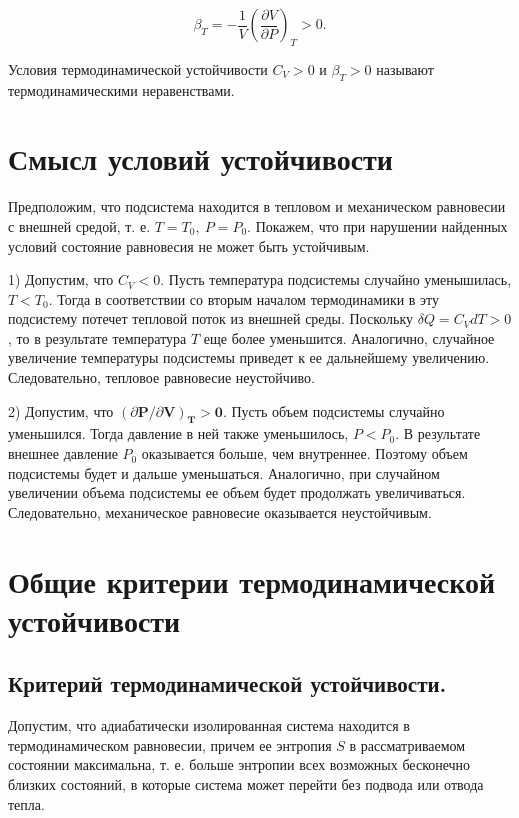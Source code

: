 \documentclass[a4paper,14pt]{article} %
\begin{document}
\begin{equation*}
	\beta_{T}=-\frac{1}{V}\left(\frac{\partial V}{\partial P}\right)_{T}>0.
\end{equation*}

Условия термодинамической устойчивости $C_V > 0$ и $\beta_{T} > 0$ называют 
термодинамическими неравенствами.

\section{Смысл условий устойчивости}

Предположим, что подсистема находится в тепловом и механическом равновесии с внешней средой, т. е. $T=T_{0},\ P=P_{0} .$ Покажем, что при нарушении найденных условий состояние равновесия не может быть устойчивым.

1) Допустим, что $C_{V}<0 .$ Пусть температура подсистемы случайно уменышилась, $T<T_{0} .$ Тогда в соответствии со вторым началом термодинамики в эту подсистему потечет тепловой поток из внешней среды. Поскольку $\delta Q=C_{V} d T>0$, то в результате температура $T$ еще более уменьшится. Аналогично, случайное увеличение температуры подсистемы приведет к ее дальнейшему увеличению. Следовательно, тепловое равновесие неустойчиво.

2) Допустим, что $(\partial \boldsymbol{P} / \partial \boldsymbol{V})_{\boldsymbol{T}}>\mathbf{0 .}$ Пусть объем подсистемы случайно уменьшился. Тогда давление в ней также уменьшилось, $P<P_{0} .$ В результате внешнее давление $P_{0}$ оказывается больше, чем внутреннее. Поэтому объем подсистемы будет и дальше уменьшаться. Аналогично, при случайном увеличении объема подсистемы ее объем будет продолжать увеличиваться. Следовательно, механическое равновесие оказывается неустойчивым.

\section{Общие критерии термодинамической устойчивости}

\subsection{Критерий термодинамической устойчивости.}

Допустим, что адиабатически изолированная система находится
в термодинамическом равновесии, причем ее энтропия $S$ в рассматриваемом состоянии максимальна, т. е. больше энтропии всех возможных бесконечно близких состояний, в которые система может перейти без подвода или отвода тепла. \\
\end{document}
